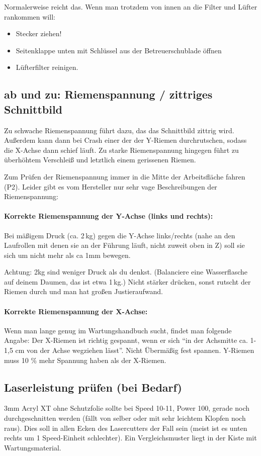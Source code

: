 \documentclass{\basedir/fablab-document}
\begin{document}
	Normalerweise reicht das. Wenn man trotzdem von innen an die Filter und Lüfter rankommen will:
	\begin{itemize}
		\item Stecker ziehen!
		\item Seitenklappe unten mit Schlüssel aus der Betreuerschublade öffnen
		\item Lüfterfilter reinigen.
	\end{itemize}

\subsection{ab und zu: Riemenspannung / zittriges Schnittbild}
	Zu schwache Riemenspannung führt dazu, das das Schnittbild zittrig wird. Außerdem kann dann bei Crash einer der der Y-Riemen durchrutschen, sodass die X-Achse dann schief läuft. Zu starke Riemenspannung hingegen führt zu überhöhtem Verschleiß und letztlich einem gerissenen Riemen.

	Zum Prüfen der Riemenspannung immer in die Mitte der Arbeitsfläche fahren (P2). Leider gibt es vom Hersteller nur sehr vage Beschreibungen der Riemenspannung:

	\paragraph{Korrekte Riemenspannung der Y-Achse (links und rechts):} Bei mäßigem Druck (ca. 2\,kg) gegen die Y-Achse links/rechts (nahe an den Laufrollen mit denen sie an der Führung läuft, nicht zuweit oben in Z) soll sie sich um nicht mehr als ca 1mm bewegen.

	Achtung: 2kg sind weniger Druck als du denkst. (Balanciere eine Wasserflasche auf deinem Daumen, das ist etwa 1\,kg.) Nicht stärker drücken, sonst rutscht der Riemen durch und man hat großen Justieraufwand.

	\paragraph{Korrekte Riemenspannung der X-Achse:} Wenn man lange genug im Wartungshandbuch sucht, findet man folgende Angabe: Der X-Riemen ist richtig gespannt, wenn er sich \enquote{in der Achsmitte ca. 1-1,5 cm von der Achse wegziehen lässt}. Nicht Übermäßig fest spannen. Y-Riemen muss 10 \% mehr Spannung haben als der X-Riemen.

\subsection{Laserleistung prüfen (bei Bedarf)}
3mm Acryl XT ohne Schutzfolie sollte bei Speed 10-11, Power 100, gerade noch durchgeschnitten werden (fällt von selber oder mit sehr leichtem Klopfen noch raus). Dies soll in allen Ecken des Lasercutters der Fall sein (meist ist es unten rechts um 1 Speed-Einheit schlechter). Ein Vergleichsmuster liegt in der Kiste mit Wartungsmaterial.
\end{document}
